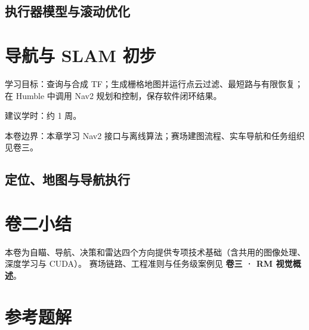 \documentclass[
  lang=cn,
  scheme=chinese,
  chinesefont=ctexfont,
  11pt,
  oneside,
  device=normal,
  color=cyan,
  mode=fancy
]{elegantbook}
\begin{document}
\section{执行器模型与滚动优化}





\chapter{导航与 SLAM 初步}

\begin{introduction}
  \item 学习目标：查询与合成 TF；生成栅格地图并运行点云过滤、最短路与有限恢复；在 Humble 中调用 Nav2 规划和控制，保存软件闭环结果。
  \item 建议学时：约 1 周。
  \item 本卷边界：本章学习 Nav2 接口与离线算法；赛场建图流程、实车导航和任务组织见卷三。
\end{introduction}

\section{定位、地图与导航执行}





\chapter*{卷二小结}
本卷为自瞄、导航、决策和雷达四个方向提供专项技术基础（含共用的图像处理、深度学习与 CUDA）。
赛场链路、工程准则与任务级案例见 \textbf{卷三 · RM 视觉概述}。

\chapter*{参考题解}

\end{document}
